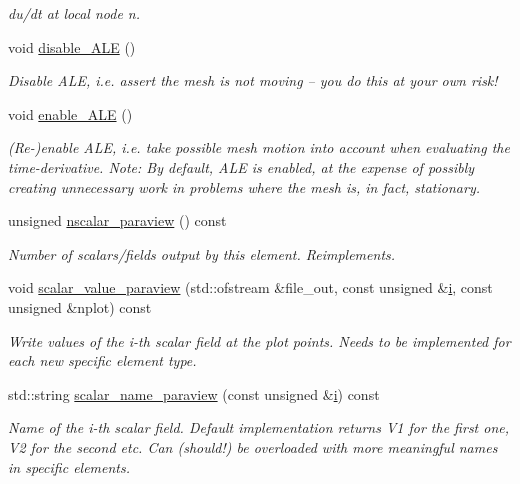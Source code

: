 \begin{DoxyCompactItemize}
\begin{DoxyCompactList}\small\item\em du/dt at local node n. \end{DoxyCompactList}\item 
void \hyperlink{classoomph_1_1AdvectionDiffusionEquations_aa635388e5e1139e0a1eae97ca89279d0}{disable\+\_\+\+A\+LE} ()
\begin{DoxyCompactList}\small\item\em Disable A\+LE, i.\+e. assert the mesh is not moving -- you do this at your own risk! \end{DoxyCompactList}\item 
void \hyperlink{classoomph_1_1AdvectionDiffusionEquations_a949dd5a3eb9803c993c1f4506cfd5d82}{enable\+\_\+\+A\+LE} ()
\begin{DoxyCompactList}\small\item\em (Re-\/)enable A\+LE, i.\+e. take possible mesh motion into account when evaluating the time-\/derivative. Note\+: By default, A\+LE is enabled, at the expense of possibly creating unnecessary work in problems where the mesh is, in fact, stationary. \end{DoxyCompactList}\item 
unsigned \hyperlink{classoomph_1_1AdvectionDiffusionEquations_a70205e9d39d7ff9660a53402d5636c1f}{nscalar\+\_\+paraview} () const
\begin{DoxyCompactList}\small\item\em Number of scalars/fields output by this element. Reimplements. \end{DoxyCompactList}\item 
void \hyperlink{classoomph_1_1AdvectionDiffusionEquations_a7e4c60334ef457e6155e84a9d24062cf}{scalar\+\_\+value\+\_\+paraview} (std\+::ofstream \&file\+\_\+out, const unsigned \&\hyperlink{cfortran_8h_adb50e893b86b3e55e751a42eab3cba82}{i}, const unsigned \&nplot) const
\begin{DoxyCompactList}\small\item\em Write values of the i-\/th scalar field at the plot points. Needs to be implemented for each new specific element type. \end{DoxyCompactList}\item 
std\+::string \hyperlink{classoomph_1_1AdvectionDiffusionEquations_a37c30bb64389d12ffef51f046d846886}{scalar\+\_\+name\+\_\+paraview} (const unsigned \&\hyperlink{cfortran_8h_adb50e893b86b3e55e751a42eab3cba82}{i}) const
\begin{DoxyCompactList}\small\item\em Name of the i-\/th scalar field. Default implementation returns V1 for the first one, V2 for the second etc. Can (should!) be overloaded with more meaningful names in specific elements. \end{DoxyCompactList}\item 

\end{DoxyCompactItemize}
